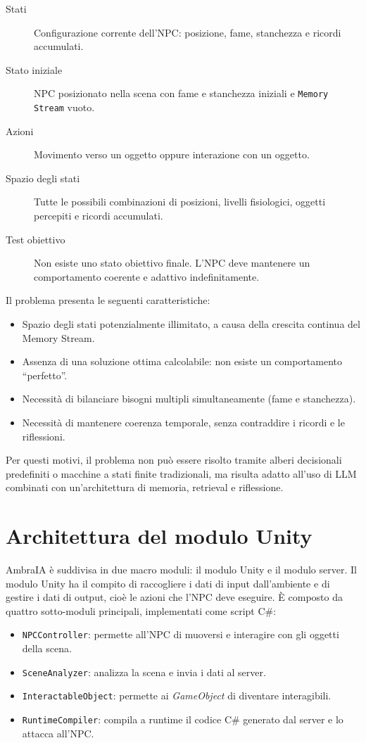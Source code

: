 \begin{description}
	\item[Stati] Configurazione corrente dell'NPC: posizione, fame, stanchezza e ricordi accumulati.
	\item[Stato iniziale] NPC posizionato nella scena con fame e stanchezza iniziali e \texttt{Memory Stream} vuoto.
	\item[Azioni] Movimento verso un oggetto oppure interazione con un oggetto.
	\item[Spazio degli stati] Tutte le possibili combinazioni di posizioni, livelli fisiologici, oggetti percepiti e ricordi accumulati.
	\item[Test obiettivo] Non esiste uno stato obiettivo finale. L'NPC deve mantenere un comportamento coerente e adattivo indefinitamente.
\end{description}

Il problema presenta le seguenti caratteristiche:

\begin{itemize}
	\item Spazio degli stati potenzialmente illimitato, a causa della crescita continua del Memory Stream.
	\item Assenza di una soluzione ottima calcolabile: non esiste un comportamento ``perfetto''.
	\item Necessità di bilanciare bisogni multipli simultaneamente (fame e stanchezza).
	\item Necessità di mantenere coerenza temporale, senza contraddire i ricordi e le riflessioni.
\end{itemize}

Per questi motivi, il problema non può essere risolto tramite alberi decisionali predefiniti o macchine a stati finite tradizionali, ma risulta adatto all'uso di LLM combinati con un'architettura di memoria, retrieval e riflessione.

\section{Architettura del modulo Unity}

AmbraIA è suddivisa in due macro moduli: il modulo Unity e il modulo server. Il modulo Unity ha il compito di raccogliere i dati di input dall'ambiente e di gestire i dati di output, cioè le azioni che l'NPC deve eseguire. È composto da quattro sotto-moduli principali, implementati come script C\#:

\begin{itemize}
	\item \texttt{NPCController}: permette all'NPC di muoversi e interagire con gli oggetti della scena.
	\item \texttt{SceneAnalyzer}: analizza la scena e invia i dati al server.
	\item \texttt{InteractableObject}: permette ai \textit{GameObject} di diventare interagibili.
	\item \texttt{RuntimeCompiler}: compila a runtime il codice C\# generato dal server e lo attacca all'NPC.
\end{itemize}

